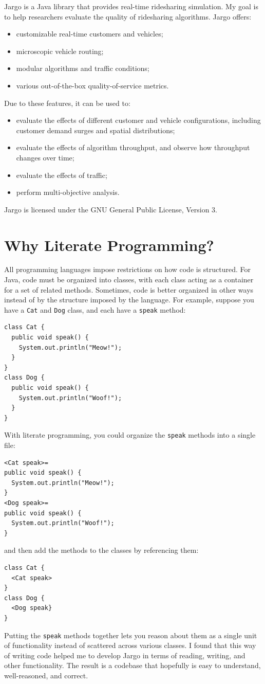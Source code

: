 Jargo is a Java library that provides real-time ridesharing simulation. My
goal is to help researchers evaluate the quality of ridesharing algorithms.
Jargo offers:
\begin{itemize}
\item customizable real-time customers and vehicles;
\item microscopic vehicle routing;
\item modular algorithms and traffic conditions;
\item various out-of-the-box quality-of-service metrics.
\end{itemize}
Due to these features, it can be used to:
\begin{itemize}
\item evaluate the effects of different customer and vehicle configurations,
  including customer demand surges and spatial distributions;
\item evaluate the effects of algorithm throughput, and observe how
  throughput changes over time;
\item evaluate the effects of traffic;
\item perform multi-objective analysis.
\end{itemize}
Jargo is licensed under the GNU General Public License, Version 3.

\section*{Why Literate Programming?}

All programming languages impose restrictions on how code is structured. For
Java, code must be organized into classes, with each class acting as a
container for a set of related methods. Sometimes, code is better organized in
other ways instead of by the structure imposed by the language. For example,
suppose you have a \texttt{Cat} and \texttt{Dog} class, and each have a
\texttt{speak} method:
\begin{verbatim}
class Cat {
  public void speak() {
    System.out.println("Meow!");
  }
}
class Dog {
  public void speak() {
    System.out.println("Woof!");
  }
}
\end{verbatim}
With literate programming, you could organize the \texttt{speak} methods into a
single file:
\begin{verbatim}
<Cat speak>=
public void speak() {
  System.out.println("Meow!");
}
<Dog speak>=
public void speak() {
  System.out.println("Woof!");
}
\end{verbatim}
and then add the methods to the classes by referencing them:
\begin{verbatim}
class Cat {
  <Cat speak>
}
class Dog {
  <Dog speak}
}
\end{verbatim}
Putting the \texttt{speak} methods together lets you reason about them as a
single unit of functionality instead of scattered across various classes.
I found that this way of writing code helped me to develop Jargo in terms of
reading, writing, and other functionality. The result is a codebase that
hopefully is easy to understand, well-reasoned, and correct.

